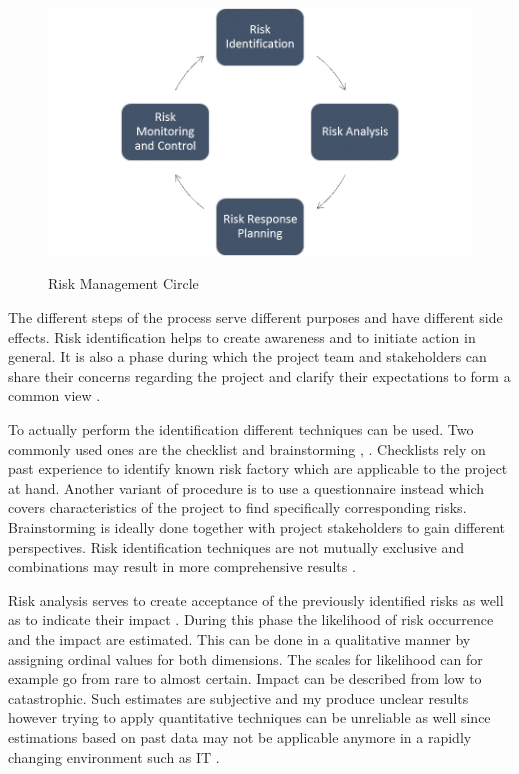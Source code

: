 \begin{figure}[htbp] 
	\centering
	\includegraphics[width=1.0\textwidth]{Content/Theory/RiskManagementCycle.png}
	\caption{Risk Management Circle}
	\cite{own representation}
	\label{fig:riskmanagmentcycle}
\end{figure}

The different steps of the process serve different purposes and have different side effects. Risk identification helps to create awareness and to initiate action in general. It is also a phase during which the project team and stakeholders can share their concerns regarding the project and clarify their expectations to form a common view \cite{didragaRoleEffectsRisk2013}.

To actually perform the identification different techniques can be used. Two commonly used ones are the checklist and brainstorming \cite{islamSoftwareDevelopmentRisk2011}, \cite{didragaRoleEffectsRisk2013}. Checklists rely on past experience to identify known risk factory which are applicable to the project at hand. Another variant of procedure is to use a questionnaire instead which covers characteristics of the project to find specifically corresponding risks. Brainstorming is ideally done together with project stakeholders to gain different perspectives. Risk identification techniques are not mutually exclusive and combinations may result in more comprehensive results \cite{islamSoftwareDevelopmentRisk2011}.

Risk analysis serves to create acceptance of the previously identified risks as well as to indicate their impact \cite{didragaRoleEffectsRisk2013}. During this phase the likelihood of risk occurrence and the impact are estimated. This can be done in a qualitative manner by assigning ordinal values for both dimensions. The scales for likelihood can for example go from rare to almost certain. Impact can be described from low to catastrophic. Such estimates are subjective and my produce unclear results however trying to apply quantitative techniques can be unreliable as well since estimations based on past data may not be applicable anymore in a rapidly changing environment such as IT \cite{islamSoftwareDevelopmentRisk2011}.

